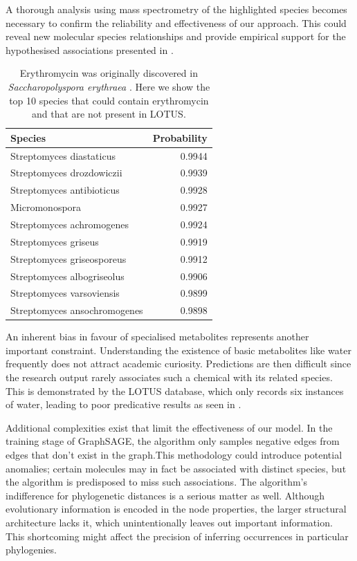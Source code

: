 \documentclass[
11pt, %
oneside, %
english, %
singlespacing, %
headsepline, %
chapterinoneline, %
]{MastersDoctoralThesis} %
\begin{document}
A thorough analysis using mass spectrometry of the highlighted species becomes necessary to confirm the reliability and effectiveness of our approach. This could reveal new molecular species relationships and provide empirical support for the hypothesised associations presented in .

\begin{table}[h]
	\centering
	\caption{Erythromycin was originally discovered in \textit{Saccharopolyspora erythraea } \cite{beranIsolationErythromycinNoxide1991}. Here we show the top 10 species that could contain erythromycin and that are not present in LOTUS.}
	\begin{tabular}{lr}
		\toprule
		Species & Probability \\
		\midrule
		Streptomyces diastaticus & 0.9944 \\
		Streptomyces drozdowiczii & 0.9939 \\
		Streptomyces antibioticus & 0.9928 \\
		Micromonospora & 0.9927 \\
		Streptomyces achromogenes & 0.9924 \\
		Streptomyces griseus & 0.9919 \\
		Streptomyces griseosporeus & 0.9912 \\
		Streptomyces albogriseolus & 0.9906 \\
		Streptomyces varsoviensis & 0.9899 \\
		Streptomyces ansochromogenes & 0.9898 \\
		\bottomrule
	\end{tabular}
	\label{table: Erythromycin top scores}
\end{table}

An inherent bias in favour of specialised metabolites represents another important constraint. Understanding the existence of basic metabolites like water frequently does not attract academic curiosity. Predictions are then difficult since the research output rarely associates such a chemical with its related species. This is demonstrated by the LOTUS database, which only records six instances of water, leading to poor predicative results as seen in .

Additional complexities exist that limit the effectiveness of our model. In the training stage of GraphSAGE, the algorithm only samples negative edges from edges that don't exist in the graph.This methodology could introduce potential anomalies; certain molecules may in fact be associated with distinct species, but the algorithm is predisposed to miss such associations. The algorithm's indifference for phylogenetic distances is a serious matter as well. Although evolutionary information is encoded in the node properties, the larger structural architecture lacks it, which unintentionally leaves out important information. This shortcoming might affect the precision of inferring occurrences in particular phylogenies. 
\end{document}
